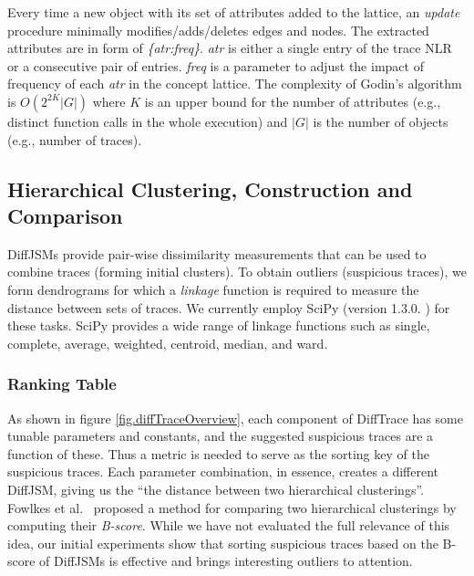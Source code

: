 Every time a new object with its set of attributes added to the lattice,
an \textit{update} procedure minimally modifies/adds/deletes edges and nodes.
%
%
The extracted attributes are in form of \textit{\{atr:freq\}}. 
%
\textit{atr} is either a single entry of the trace NLR or a consecutive pair of entries.
\textit{freq} is a parameter to adjust the impact of frequency of each \textit{atr}
in the concept lattice.
%
The complexity of Godin's algorithm is $O(2^{2K}|G|)$ where $K$ is an upper bound for the number of attributes (e.g., distinct function calls in the whole execution) and $|G|$ is the number of objects (e.g., number of traces).




\subsection{Hierarchical Clustering, Construction and Comparison}
\label{subsec:algo-bscore}

 DiffJSMs provide pair-wise dissimilarity
 measurements that can be used to combine traces (forming initial clusters).
%
To obtain outliers (suspicious traces),
we form dendrograms for which
a \textit{linkage} function is required to measure the distance between sets of traces.
% 
 We currently employ SciPy (version 1.3.0. \cite{scipy}) for these tasks.
%
%
 SciPy provides a wide range of linkage functions
 such as single, complete, average, weighted, centroid, median, and ward.

\subsubsection{Ranking Table}
As shown in figure \ref{fig.diffTraceOverview},
each component of DiffTrace has some tunable parameters and constants,
and the suggested suspicious traces are a function of these.
%
Thus a metric is needed to serve as the sorting key of the suspicious traces.
%
Each parameter combination, in essence, creates a different DiffJSM,
giving us the ``the distance between two hierarchical clusterings''.
%
Fowlkes et al.~\cite{fowlkes83} proposed a method for comparing two
hierarchical clusterings by computing their \textit{B-score}.
%
While we have not evaluated the full relevance of this idea,
our initial experiments show that sorting suspicious traces based on the B-score of DiffJSMs is
effective and brings interesting outliers to attention.

